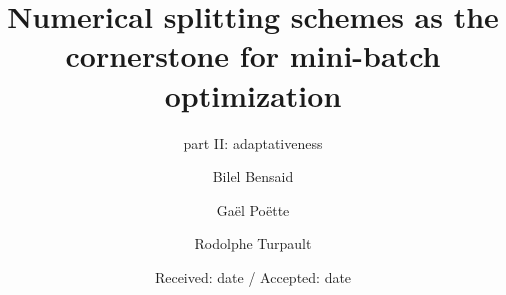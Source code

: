 \newcommand{\Frac}[2]{\displaystyle \frac{#1}{#2}\otimes }
\newcommand{\BlackBox}{\rule{1.5ex}{1.5ex}}

\newcommand{\polyTwo}{PolyGlobalMild }
\newcommand{\polyThree}{PolyLocalMild }
\newcommand{\polyFour}{PolyGlobalStiff }
\newcommand{\polyFive}{PolyAllStiff }

\newcommand{\exOne}{$"2Gen"$ }
\newcommand{\exTwo}{$"2Ego>Gen"$ }
\newcommand{\exThree}{$"2Ego<Eq<Gen"$ }
\newcommand{\exFour}{$"2Ego\ll Gen"$ }
\newcommand{\exFive}{$"3Gen"$ }
\newcommand{\exSix}{$"3Ego<2Plot\approx Gen"$ }
\newcommand{\exSeven}{$"3Ego\ll Gen"$ }
\newcommand{\exHeight}{$"4Ego<2Plot<Gen"$ }

\newcommand{\mg}{gm} %
\newcommand{\ml}{lm}
\newcommand{\ps}{sp}
\newcommand{\Speth}{eS}







\title{Numerical splitting schemes as the cornerstone for mini-batch optimization}
\subtitle{part II: adaptativeness}


\author{Bilel Bensaid     \and
		Ga\"el Po\"ette   \and
        Rodolphe Turpault
}



\date{Received: date / Accepted: date}


\maketitle

